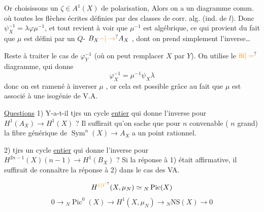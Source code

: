 Or choisissons un $\zeta\in A^1(X)$ de polarisation, Alors on a un diagramme comm.
où toutes les flèches écrites   définies par des classes de corr. alg. (ind. de $l$).  Donc $\psi_X^{-1}=\lambda\varphi\mu^{-1}$, et tout revient à voir que $\mu^{-1}$ est algébrique, ce qui provient du fait que $\mu$ est défini par un $Q$- $B_X\unsure{\mathbin{-}|\to}A_X$ , dont on prend simplement l'inverse\ldots{}

Reste à traiter le cas de $\varphi_Y^{-1}$ (où on peut remplacer $X$ par $Y$). On utilise le $\unsure{\overline{\mathrm m}|=}$ diagramme, qui donne
\[
\varphi_X^{-1}=\mu^{-1}\psi_X\lambda
\]
donc on est ramené à inverser $\mu$ , or cela est possible grâce au fait que $\mu$ est associé à une isogénie de V.A.

\uline{Questions} 1) Y-a-t-il tjrs un cycle \uline{entier} qui donne l'inverse pour $H^1(A_X)\to H^1(X)$ ? Il suffirait qu'on sache que pour $n$  convenable ( $n$ grand) la fibre générique de $\operatorname{Sym}^n(X)\to A_X$ a un point rationnel.

2)  tjrs un cycle \uline{entier} qui donne l'inverse pour $H^{2n-1}(X)(n-1)\to H^1(B_X)$ ? Si la réponse à 1) était affirmative, il suffirait de connaître la réponse à 2) dans le cas des VA.

\[
H^{\unsure{1|1'}}(X,\mu_N)\simeq {}_N\operatorname{Pic}(X)
\]
\[
0\to {}_N\operatorname{Pic}^0(X)\to H^1(X,\mu_N)\to {}_N\mathrm{NS}(X)\to 0
\]

